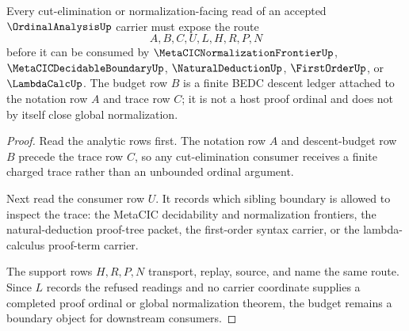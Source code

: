 \begin{theorem}
\label{thm:ordinal-analysis-cut-elimination-budget}
Every cut-elimination or normalization-facing read of an accepted $\OrdinalAnalysisUp$ carrier must expose the route
$$
A,B,C,U,L,H,R,P,N
$$
before it can be consumed by $\MetaCICNormalizationFrontierUp$, $\MetaCICDecidableBoundaryUp$, $\NaturalDeductionUp$, $\FirstOrderUp$, or $\LambdaCalcUp$. The budget row $B$ is a finite BEDC descent ledger attached to the notation row $A$ and trace row $C$; it is not a host proof ordinal and does not by itself close global normalization.
\end{theorem}
\begin{proof}
Read the analytic rows first. The notation row $A$ and descent-budget row $B$ precede the trace row $C$, so any cut-elimination consumer receives a finite charged trace rather than an unbounded ordinal argument.

Next read the consumer row $U$. It records which sibling boundary is allowed to inspect the trace: the MetaCIC decidability and normalization frontiers, the natural-deduction proof-tree packet, the first-order syntax carrier, or the lambda-calculus proof-term carrier.

The support rows $H,R,P,N$ transport, replay, source, and name the same route. Since $L$ records the refused readings and no carrier coordinate supplies a completed proof ordinal or global normalization theorem, the budget remains a boundary object for downstream consumers.
\end{proof}



